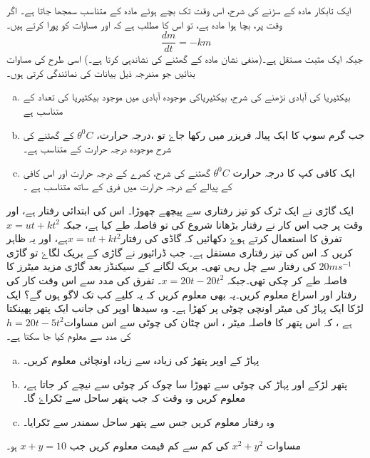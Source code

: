 ایک تابکار مادہ کے سڑنے کی شرح، اس وقت تک بچے ہوئے مادہ کے متناسب سمجھا جاتا ہے۔ اگر وقت  پر، بچا ہوا مادہ  ہے، تو اس کا مطلب ہے کہ  اور  مساوات کو پورا کرتے ہیں۔
\[ \frac{dm}{dt}=-km \]
جبکہ  ایک مثبت مستقل ہے۔(منفی نشان مادہ کے گھٹنے کی نشاندہی کرتا ہے۔)
اسی طرح کی مساوات بنائیں جو مندرجہ ذیل بیانات کی نمائندگی کرتی ہوں۔
\begin{enumerate}[a.]
\item
بیکٹیریا کی آبادی نڑھنے کی شرح، بیکٹیریاکی موجودہ آبادی میں موجود بیکٹیریا کی تعداد  کے متناسب ہے
\item
جب گرم سوپ کا ایک پیالہ فریزر میں رکھا جاۓ تو ،درجہ حرارت، \(\theta^0 C\) کے گھٹنے کی شرح موجودہ درجہ حرارت کے متناسب ہے۔
\item
ایک کافی  کپ کا درجہ حرارت  \(\theta^0 C\) گھٹنے کی شرح، کمرے کے درجہ حرارت اور اس کافی کے پیالے کے درجہ حرارت میں فرق کے ساتھ  متناسب ہے ۔
\end{enumerate}
ایک گاڑی نے ایک ٹرک کو تیز رفتاری سے پیچھے چھوڑا۔ اس کی ابتدائی رفتار  ہے، اور وقت  پر جب اس کار نے رفتار بڑھانا شروع کی تو   فاصلہ طے کیا ہے، جبکہ \( x=ut+kt^2 \)
تفرق کا استعمال کرتے ہوۓ دکھائیں کہ گاڈی کی رفتار\( x=ut+kt^2 \)ہے، اور یہ ظاہر کریں کہ اس کی تیز رفتاری مستقل ہے۔
جب ڈرائیور نے گاڑی کے بریک لگاۓ تو گاڑی \( 20ms^{-1}\) کی رفتار سے چل رہی تھی۔ بریک لگانے کے  سیکنڈز بعد گاڑی مزید  میٹرز کا فاصلہ طے کر چکی تھی۔جبکہ \( x=20t-20t^2 \)۔ تفرق کی مدد سے اس وقت کار کی رفتار اور اسراع معلوم کریں۔یہ بھی معلوم کریں کہ یہ کلیے کب تک لاگو ہوں گے؟
ایک لڑکا ایک پہاڑ کی  میٹر اونچی چوٹی پر کھڑا ہے۔ وہ سیدھا اوپر کی جانب ایک پتھر پھینکتا ہے ، کہ اس پتھر کا فاصلہ   میٹر ، اس چٹان کی چوٹی سے اس مساوات\( h=20t-5t^2 \) کی مدد  سے معلوم کیا جا سکتا ہے۔
 
\begin{enumerate}[a.]
\item
 پہاڑ کے اوپر پتھڑ کی زیادہ سے زیادہ اونچائی معلوم کریں۔
\item
پتھر لڑکے اور پہاڑ کی چوٹی سے تھوڑا سا چوک کر چوٹی سے نیچے کر جاتا ہے، معلوم کریں وہ وقت کہ جب پتھر ساحل سے ٹکراۓ گا۔
\item
وہ رفتار معلوم کریں جس سے پتھر ساحل سمندر سے ٹکرایا۔
\end{enumerate}

مساوات \( x^2+y^2 \) کی کم سے کم قیمت معلوم کریں جب  \(x+y=10 \) ہو۔

